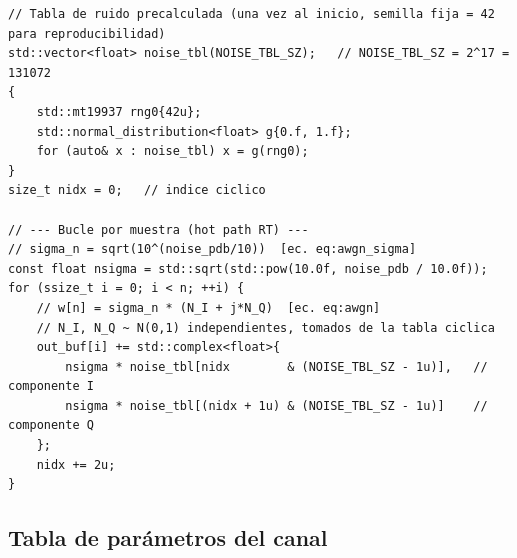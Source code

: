 \documentclass[11pt,a4paper]{article}
\begin{document}
\begin{lstlisting}[style=cpp,
  caption={Generación de ruido AWGN con tabla precalculada — ChannelSimulator.cpp, líneas 78--86 y 196--206}]
// Tabla de ruido precalculada (una vez al inicio, semilla fija = 42 para reproducibilidad)
std::vector<float> noise_tbl(NOISE_TBL_SZ);   // NOISE_TBL_SZ = 2^17 = 131072
{
    std::mt19937 rng0{42u};
    std::normal_distribution<float> g{0.f, 1.f};
    for (auto& x : noise_tbl) x = g(rng0);
}
size_t nidx = 0;   // indice ciclico

// --- Bucle por muestra (hot path RT) ---
// sigma_n = sqrt(10^(noise_pdb/10))  [ec. eq:awgn_sigma]
const float nsigma = std::sqrt(std::pow(10.0f, noise_pdb / 10.0f));
for (ssize_t i = 0; i < n; ++i) {
    // w[n] = sigma_n * (N_I + j*N_Q)  [ec. eq:awgn]
    // N_I, N_Q ~ N(0,1) independientes, tomados de la tabla ciclica
    out_buf[i] += std::complex<float>{
        nsigma * noise_tbl[nidx        & (NOISE_TBL_SZ - 1u)],   // componente I
        nsigma * noise_tbl[(nidx + 1u) & (NOISE_TBL_SZ - 1u)]    // componente Q
    };
    nidx += 2u;
}
\end{lstlisting}

\subsection{Tabla de parámetros del canal}
\end{document}
